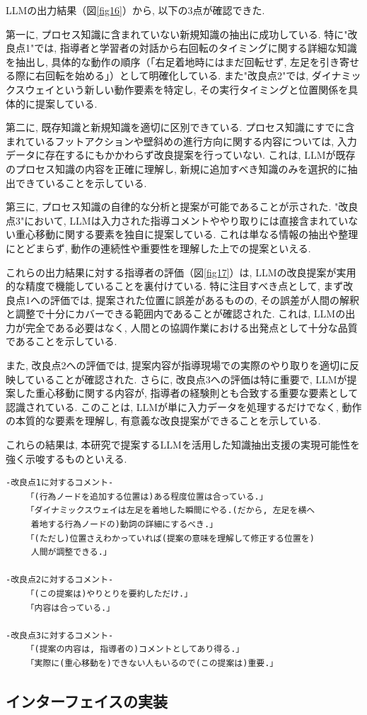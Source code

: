 LLMの出力結果（図\ref{fig16}）から, 以下の3点が確認できた.

第一に, プロセス知識に含まれていない新規知識の抽出に成功している. 特に"改良点1"では, 指導者と学習者の対話から右回転のタイミングに関する詳細な知識を抽出し, 具体的な動作の順序（「右足着地時にはまだ回転せず, 左足を引き寄せる際に右回転を始める」）として明確化している. また"改良点2"では, ダイナミックスウェイという新しい動作要素を特定し, その実行タイミングと位置関係を具体的に提案している.

第二に, 既存知識と新規知識を適切に区別できている. プロセス知識にすでに含まれているフットアクションや壁斜めの進行方向に関する内容については, 入力データに存在するにもかかわらず改良提案を行っていない. これは, LLMが既存のプロセス知識の内容を正確に理解し, 新規に追加すべき知識のみを選択的に抽出できていることを示している.

第三に, プロセス知識の自律的な分析と提案が可能であることが示された. "改良点3"において, LLMは入力された指導コメントややり取りには直接含まれていない重心移動に関する要素を独自に提案している. これは単なる情報の抽出や整理にとどまらず, 動作の連続性や重要性を理解した上での提案といえる.

これらの出力結果に対する指導者の評価（図\ref{fig17}）は, LLMの改良提案が実用的な精度で機能していることを裏付けている. 特に注目すべき点として, まず改良点1への評価では, 提案された位置に誤差があるものの, その誤差が人間の解釈と調整で十分にカバーできる範囲内であることが確認された. これは, LLMの出力が完全である必要はなく, 人間との協調作業における出発点として十分な品質であることを示している.

また, 改良点2への評価では, 提案内容が指導現場での実際のやり取りを適切に反映していることが確認された. さらに, 改良点3への評価は特に重要で, LLMが提案した重心移動に関する内容が, 指導者の経験則とも合致する重要な要素として認識されている. このことは, LLMが単に入力データを処理するだけでなく, 動作の本質的な要素を理解し, 有意義な改良提案ができることを示している.

これらの結果は, 本研究で提案するLLMを活用した知識抽出支援の実現可能性を強く示唆するものといえる.


\begin{tcolorbox}[breakable, colback=white, colframe=black]
    \begin{verbatim}
-改良点1に対するコメント-
    「(行為ノードを追加する位置は)ある程度位置は合っている.」
    「ダイナミックスウェイは左足を着地した瞬間にやる.(だから, 左足を横へ
     着地する行為ノードの)動詞の詳細にするべき.」
    「(ただし)位置さえわかっていれば(提案の意味を理解して修正する位置を)
     人間が調整できる.」

-改良点2に対するコメント-
    「(この提案は)やりとりを要約しただけ.」
    「内容は合っている.」

-改良点3に対するコメント-
    「(提案の内容は, 指導者の)コメントとしてあり得る.」
    「実際に(重心移動を)できない人もいるので(この提案は)重要.」
    \end{verbatim}
\end{tcolorbox}
    
\label{fig17}



\subsection{インターフェイスの実装}



